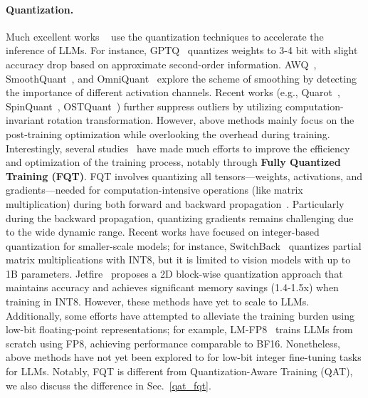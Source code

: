 \paragraph{Quantization.} Much excellent works ~\cite{yuan2023rptq,shang2023pbllm,yuan2023asvd,yue2024wkvquant, frantar2022gptq, xiao2022smoothquant,hu2024illm} use the quantization techniques to accelerate the inference of LLMs. For instance, GPTQ~\cite{frantar2022gptq} quantizes weights to 3-4 bit with slight accuracy drop based on approximate second-order information. AWQ~\cite{lin2024awq}, SmoothQuant~\cite{xiao2022smoothquant}, and OmniQuant~\cite{shaoomniquant} explore the scheme of smoothing by detecting the importance of different activation channels. Recent works (e.g., Quarot~\cite{ashkboos2024quarot}, SpinQuant~\cite{liu2024spinquant}, OSTQuant~\cite{hu2025ostquant}) further suppress outliers by utilizing computation-invariant rotation transformation. However, above methods mainly focus on the post-training optimization while overlooking the overhead during training. Interestingly, several studies~\cite{banner2018scalable,drumond2018training,adelman2018faster,wu2018training,langroudi2019deep,langroudi2019cheetah,yang2020training,zhu2020towards,xi2023training} have made much efforts to improve the efficiency and optimization of the training process, notably through \textbf{Fully Quantized Training (FQT)}. FQT involves quantizing all tensors—weights, activations, and gradients—needed for computation-intensive operations (like matrix multiplication) during both forward and backward propagation~\cite{wang2018training,yang2020training,zhu2020towards}. Particularly during the backward propagation, quantizing gradients remains challenging due to the wide dynamic range. Recent works have focused on integer-based quantization for smaller-scale models; for instance, SwitchBack~\citep{switchback} quantizes partial matrix multiplications with INT8, but it is limited to vision models with up to 1B parameters. Jetfire~\citep{jetfire} proposes a 2D block-wise quantization approach that maintains accuracy and achieves significant memory savings (1.4-1.5x) when training in INT8. However, these methods have yet to scale to LLMs. Additionally, some efforts have attempted to alleviate the training burden using low-bit floating-point representations; for example, LM-FP8~\citep{peng2023fp8} trains LLMs from scratch using FP8, achieving performance comparable to BF16. Nonetheless, above methods have not yet been explored to for low-bit integer fine-tuning tasks for LLMs. Notably, FQT is different from Quantization-Aware Training (QAT), we also discuss the difference in Sec.~\ref{qat_fqt}.
